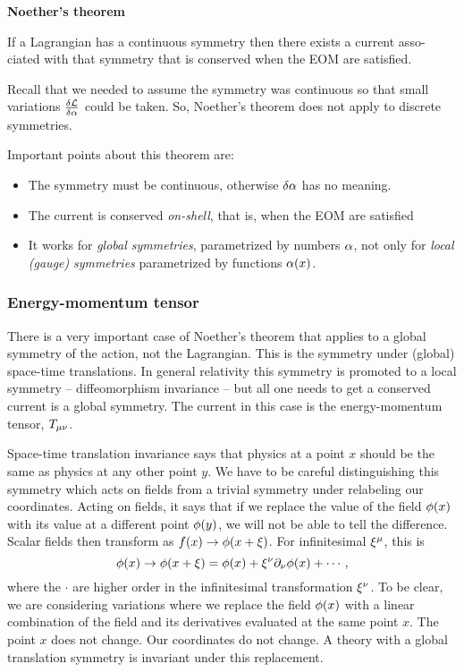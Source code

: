 \begin{teo}{\textbf{Noether's theorem}}

	If a Lagrangian has a continuous symmetry then there exists a current asso- ciated with that symmetry that is conserved when the EOM are satisfied.
\end{teo}

Recall that we needed to assume the symmetry was continuous so that small variations $\frac{\delta\mathcal{L} }{\delta\alpha }$ could be taken. So, Noether's theorem does not apply to discrete symmetries.

Important points about this theorem are:
\begin{itemize}
	\item The symmetry must be continuous, otherwise $\delta \alpha $ has no meaning.
	\item The current is conserved \textit{on-shell}, that is, when the EOM are satisfied
	\item It works for \textit{global symmetries}, parametrized by numbers $\alpha $, not only for \textit{local (gauge)} \textit{symmetries} parametrized by functions $\alpha(x)$.
\end{itemize}

\subsubsection{Energy-momentum tensor}
There is a very important case of Noether's theorem that applies to a global symmetry of the action, not the Lagrangian. This is the symmetry under (global) space-time translations. In general relativity this symmetry is promoted to a local symmetry -- diffeomorphism invariance -- but all one needs to get a conserved current is a global symmetry. The current in this case is the energy-momentum tensor, $T_{\mu\nu }$.

Space-time translation invariance says that physics at a point $x$ should be the same as physics at any other point $y$. We have to be careful distinguishing this symmetry which acts on fields from a trivial symmetry under relabeling our coordinates. Acting on fields, it says that if we replace the value of the field $\phi(x)$ with its value at a different point $\phi(y)$, we will not be able to tell the difference. Scalar fields then transform as $f(x)\to \phi(x+\xi )$. For infinitesimal $\xi^\mu $, this is
\begin{equation}
  \phi(x)\to \phi(x+\xi )=\phi(x)+\xi^\nu \partial_\nu \phi(x)+\cdots,
\end{equation}
where the $\cdot$ are higher order in the infinitesimal transformation $\xi^\nu $. To be clear, we are considering variations where we replace the field $\phi(x)$ with a linear combination of the field and its derivatives evaluated at the same point $x$. The point $x$ does not change. Our coordinates do not change. A theory with a global translation symmetry is invariant under this replacement.

